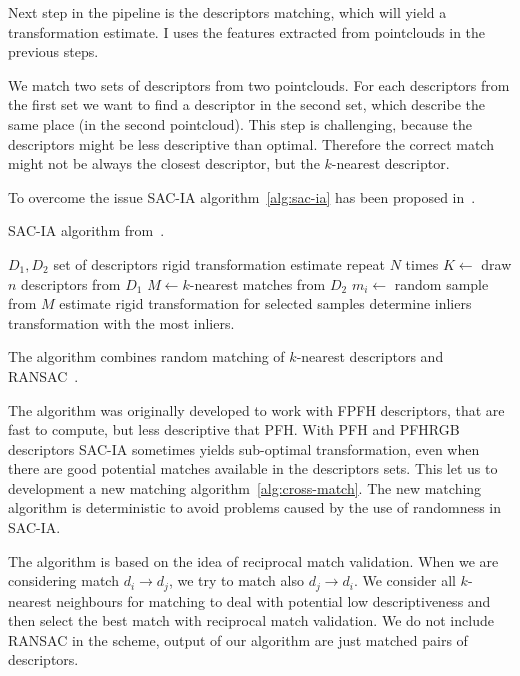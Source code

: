 Next step in the pipeline is the descriptors matching, which will yield a transformation estimate. I uses the features extracted from pointclouds in the previous steps.

We match two sets of descriptors from two pointclouds. For each descriptors from the first set we want to find a descriptor in the second set, which describe the same place (in the second pointcloud). This step is challenging, because the descriptors might be less descriptive than optimal. Therefore the correct match might not be always the closest descriptor, but the $k$-nearest descriptor.

To overcome the issue \gls{SAC-IA} algorithm~\ref{alg:sac-ia} has been proposed in~\cite{rusu2009fpfh}.

\begin{algorithm}
    \caption[\gls{SAC-IA}]{\gls{SAC-IA} algorithm from~\cite{rusu2009fpfh}.}
    \label{alg:sac-ia}
    \begin{algorithmic}[1]
        \Require $D_1, D_2$ set of descriptors
        \Ensure rigid transformation estimate
            \Loop repeat $N$ times
                \State $K \gets$ draw $n$ descriptors from $D_1$
                    \State $M \gets k$-nearest matches from $D_2$
                    \State $m_i \gets$ random sample from $M$
                \EndFor
                \State estimate rigid transformation for selected samples
                \State determine inliers
            \EndLoop
            \State \Return transformation with the most inliers.
        \EndFunction
    \end{algorithmic}
\end{algorithm}

The algorithm combines random matching of $k$-nearest descriptors and \gls{RANSAC}~\cite{fischler1981ransac}.

The algorithm was originally developed to work with \gls{FPFH} descriptors, that are fast to compute, but less descriptive that \gls{PFH}. With \gls{PFH} and \gls{PFHRGB} descriptors \gls{SAC-IA} sometimes yields sub-optimal transformation, even when there are good potential matches available in the descriptors sets. This let us to development a new matching algorithm~\ref{alg:cross-match}. The new matching algorithm is deterministic to avoid problems caused by the use of randomness in \gls{SAC-IA}.

The algorithm is based on the idea of reciprocal match validation. When we are considering match $d_i \rightarrow d_j$, we try to match also $d_j \rightarrow d_i$. We consider all $k$-nearest neighbours for matching to deal with potential low descriptiveness and then select the best match with reciprocal match validation. We do not include \gls{RANSAC} in the scheme, output of our algorithm are just matched pairs of descriptors.

